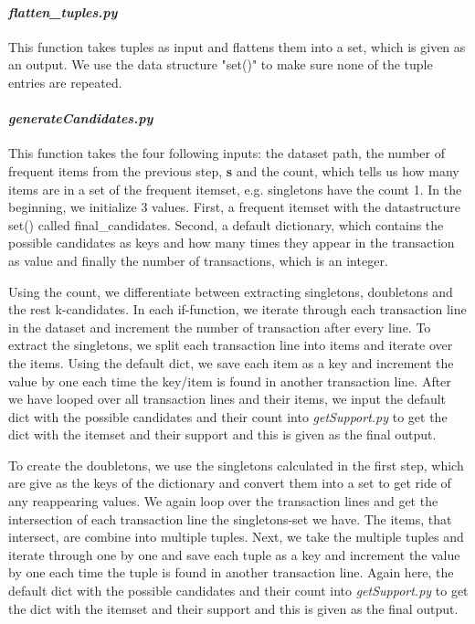 \documentclass[a4paper, 11pt]{article}
\begin{document}
\paragraph{\textit{flatten\_tuples.py}}
This function takes tuples as input and flattens them into a set, which is given as an output. We use the data structure "set()" to make sure none of the tuple entries are repeated.

\paragraph{\textit{generateCandidates.py}}
This function takes the four following inputs: the dataset path, the number of frequent items from the previous step, \textbf{s} and the count, which tells us how many items are in a set of the frequent itemset, e.g. singletons have the count 1. In the beginning, we initialize 3 values. First, a frequent itemset with the datastructure set() called final\_candidates. Second, a default dictionary, which contains the possible candidates as keys and how many times they appear in the transaction as value and finally the number of transactions, which is an integer. \newline

Using the count, we differentiate between extracting singletons, doubletons and the rest k-candidates. In each if-function, we iterate through each transaction line in the dataset and increment the number of transaction after every line. To extract the singletons, we split each transaction line into items and iterate over the items. Using the default dict, we save each item as a key and increment the value by one each time the key/item is found in another transaction line. After we have looped over all transaction lines and their items, we input the default dict with the possible candidates and their count into \textit{getSupport.py} to get the dict with the itemset and their support and this is given as the final output. \newline

To create the doubletons, we use the singletons calculated in the first step, which are give as the keys of the dictionary and convert them into a set to get ride of any reappearing values. We again loop over the transaction lines and get the intersection of each transaction line the singletons-set we have. The items, that intersect, are combine into multiple tuples. Next, we take the multiple tuples and iterate through one by one and save each tuple as a key and increment the value by one each time the tuple is found in another transaction line. Again here, the default dict with the possible candidates and their count into \textit{getSupport.py} to get the dict with the itemset and their support and this is given as the final output. \newline
\end{document}

